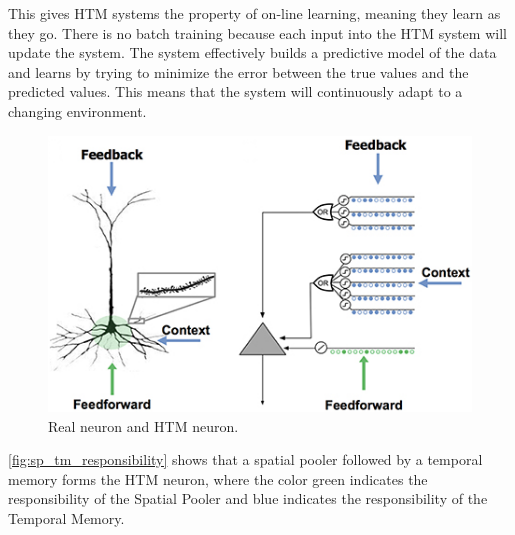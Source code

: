 This gives HTM systems the property of on-line learning, meaning they learn as they go. There is no batch training because each input into the HTM system will update the system. The system effectively builds a predictive model of the data and learns by trying to minimize the error between the true values and the predicted values. This means that the system will continuously adapt to a changing environment.
\begin{figure}[H]
    \centering
    \includegraphics[width=\linewidth]{resources/related_works/htm_neuron.png}
    \caption{Real neuron and HTM neuron. }
    \label{fig:sp_tm_responsibility}
\end{figure}
\autoref{fig:sp_tm_responsibility} shows that a spatial pooler followed by a temporal memory forms the HTM neuron, where the color green indicates the responsibility of the Spatial Pooler and blue indicates the responsibility of the Temporal Memory.
